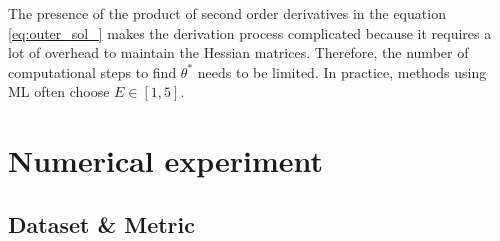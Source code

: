 \documentclass[aps,prb,groupedaddress,twocolumn,showpacs,dvipdfmx,superscriptaddress,pdftex]{revtex4-2}
\begin{document}

The presence of the product of second order derivatives in the equation \ref{eq:outer_sol_} makes the derivation process complicated because it requires a lot of overhead to maintain the Hessian matrices. Therefore, the number of computational steps to find $\theta^*$ needs to be limited. In practice, methods using ML \citep{fallah2020personalized, chen2018federated, nguyen2022meta,finn2017model, li2017meta} often choose $E\in [1,5]$.

\section{Numerical experiment}
\label{sec.experiment}

\subsection{Dataset \& Metric}

\end{document}
